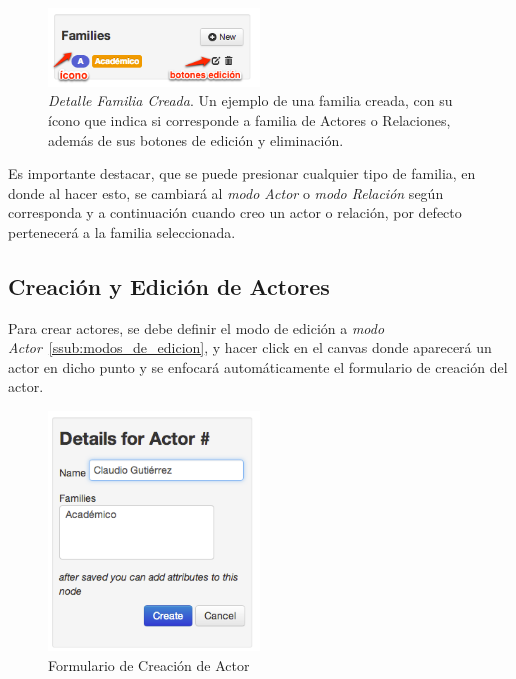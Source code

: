 \begin{figure}[H]
  \centering
  \includegraphics[width=0.5\textwidth]{images/familia_creada.png}
  \caption[Detalle Familia Creada]{\emph{Detalle Familia Creada}. Un ejemplo de una familia creada, con su ícono que indica si corresponde a familia de Actores o Relaciones, además de sus botones de edición y eliminación.}
  \label{familia_creada}
\end{figure}

Es importante destacar, que se puede presionar cualquier tipo de familia, en donde al hacer esto, se cambiará al \emph{modo Actor} o \emph{modo Relación} según corresponda y a continuación cuando creo un actor o relación, por defecto pertenecerá a la familia seleccionada.


\subsection{Creación y Edición de Actores} %
\label{sub:creacion_y_edicion_de_actores}

Para crear actores, se debe definir el modo de edición a \emph{modo Actor}~\ref{ssub:modos_de_edicion}, y hacer click en el canvas donde aparecerá un actor en dicho punto y se enfocará automáticamente el formulario de creación del actor.\\

\begin{figure}[H]
  \centering
  \includegraphics[width=0.5\textwidth]{images/creacion_actor.png}
  \caption{Formulario de Creación de Actor}
  \label{creacion_actor}
\end{figure}

